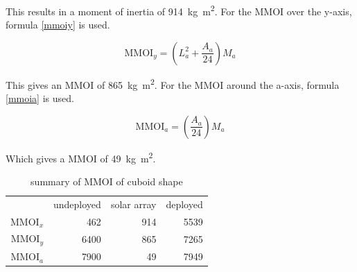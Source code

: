 This results in a moment of inertia of \SI{914}{kg.m^2}.  For the MMOI
over the y-axis, formula \ref{mmoiy} is used.

\begin{equation}
  \label{mmoiy}
  \mathrm{MMOI}_y=\left(L_a^2+\frac{A_a}{24}\right)M_a
\end{equation}

This gives an MMOI of \SI{865}{kg.m^2}.  For the MMOI around the
a-axis, formula \ref{mmoia} is used.

\begin{equation}
  \label{mmoia}
  \mathrm{MMOI}_a=\left(\frac{A_a}{24}\right)M_a
\end{equation}

Which gives a MMOI of \SI{49}{kg.m^2}.

\begin{longtable}{rrrr}
\caption{summary of MMOI of cuboid shape} \\
 & undeployed & solar array & deployed \\
 MMOI$_x$ & 462 & 914 & 5539 \\
 MMOI$_y$ & 6400 & 865 & 7265 \\
 MMOI$_a$ & 7900 & 49 & 7949 \\
\end{longtable}
